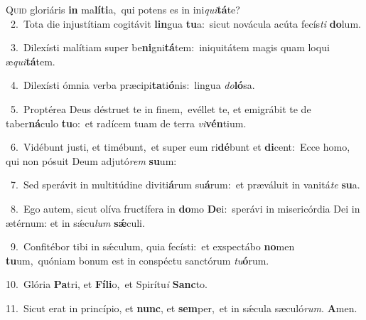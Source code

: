 \lettrine{\initial\textcolor{\initialcolor}{Q}}{uid} gloriáris \textbf{in} ma\-\textbf{lí}\-\textbf{ti}a,~\star qui potens es in ini\-\textit{qui}\-\textbf{tá}te?\\
{\numbfont\textcolor{\numbcolor}{~2.}}~Tota die injustítiam cogitávit \textbf{lin}\-gua \textbf{tu}\-a:~\star sicut novácula acúta fecís\textit{ti} \textbf{do}\-lum.\par
{\numbfont\textcolor{\numbcolor}{~3.}}~Dilexísti malítiam super be\-\textbf{ni}\-gni\-\textbf{tá}\-tem:~\star iniquitátem magis quam loqui æ\-\textit{qui}\-\textbf{tá}tem.\par
{\numbfont\textcolor{\numbcolor}{~4.}}~Dilexísti ómnia verba præcipi\-\textbf{ta}\-ti\-\textbf{ó}\-nis:~\star lingua \textit{do}\-\textbf{ló}sa.\par
{\numbfont\textcolor{\numbcolor}{~5.}}~Proptérea Deus déstruet te in finem,~\dagger evéllet te, et emigrábit te de taber\-\textbf{ná}\-culo \textbf{tu}\-o:~\star et radícem tuam de terra \textit{vi}\-\textbf{vén}tium.\par
{\numbfont\textcolor{\numbcolor}{~6.}}~Vidébunt justi, et timébunt,~\dagger et super eum ri\-\textbf{dé}\-bunt et \textbf{di}\-cent:~\star Ecce homo, qui non pósuit Deum adjutó\textit{rem} \textbf{su}\-um:\par
{\numbfont\textcolor{\numbcolor}{~7.}}~Sed sperávit in multitúdine diviti\-\textbf{á}\-rum su\-\textbf{á}\-rum:~\star et præváluit in vanitá\textit{te} \textbf{su}\-a.\par
{\numbfont\textcolor{\numbcolor}{~8.}}~Ego autem, sicut olíva fructífera in \textbf{do}\-mo \textbf{De}\-i:~\star sperávi in misericórdia Dei in ætérnum: et in sǽcu\textit{lum} \textbf{sǽ}\-culi.\par
{\numbfont\textcolor{\numbcolor}{~9.}}~Confitébor tibi in sǽculum, quia fecísti:~\dagger et exspectábo \textbf{no}\-men \textbf{tu}\-um,~\star quóniam bonum est in conspéctu sanctórum \textit{tu}\-\textbf{ó}rum.\par
{\numbfont\textcolor{\numbcolor}{10.}}~Glória \textbf{Pa}\-tri, et \textbf{Fí}\-\textbf{li}o,~\star et Spirítu\textit{i} \textbf{Sanc}\-to.\par
{\numbfont\textcolor{\numbcolor}{11.}}~Sicut erat in princípio, et \textbf{nunc}\-, et \textbf{sem}\-per,~\star et in sǽcula sæculó\-\textit{rum}\-. \textbf{A}\-men.\par
